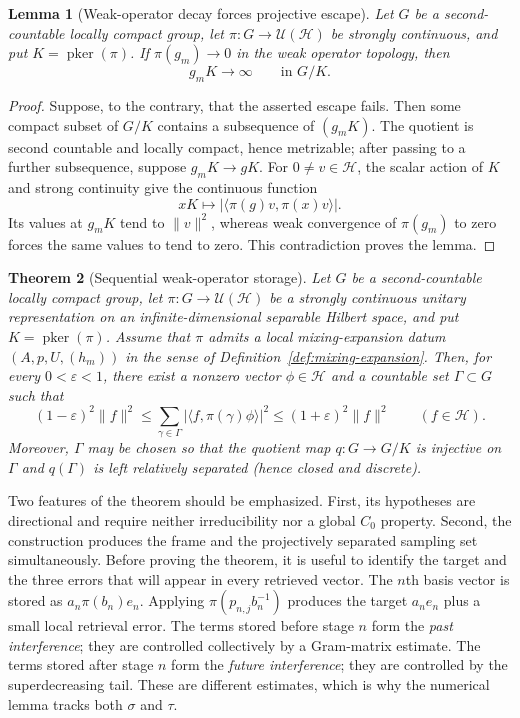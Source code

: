 \documentclass[10pt,a4paper]{amsart}
\numberwithin{equation}{section}
\newtheorem{theorem}{Theorem}[section]
\newtheorem{lemma}[theorem]{Lemma}
\newcommand{\cH}{\mathcal H}
\newcommand{\U}{\mathcal U}
\newcommand{\pker}{\operatorname{pker}}
\begin{document}
\begin{lemma}[Weak-operator decay forces projective escape]
\label{lem:wot-projective-escape}
Let $G$ be a second-countable locally compact group, let
$\pi:G\to\U(\cH)$ be strongly continuous, and put $K=\pker(\pi)$.  If
$\pi(g_m)\to0$ in the weak operator topology, then
\[
  g_mK\longrightarrow\infty\qquad\text{in }G/K.
\]
\end{lemma}

\begin{proof}
Suppose, to the contrary, that the asserted escape fails.  Then some compact
subset of $G/K$ contains a subsequence of $(g_mK)$.
The quotient is second countable and locally compact, hence metrizable; after
passing to a further subsequence, suppose $g_mK\to gK$.  For $0\neq v\in\cH$,
the scalar action of $K$ and strong continuity give the continuous function
\[
 xK\longmapsto |\langle\pi(g)v,\pi(x)v\rangle|.
\]
Its values at $g_mK$ tend to $\|v\|^2$, whereas weak convergence of
$\pi(g_m)$ to zero forces the same values to tend to zero.  This
contradiction proves the lemma.
\end{proof}

\begin{theorem}[Sequential weak-operator storage]
\label{thm:abstract-storage}
Let $G$ be a second-countable locally compact group, let
$\pi:G\to\U(\cH)$ be a strongly continuous unitary representation on an
infinite-dimensional separable Hilbert space, and put $K=\pker(\pi)$.
Assume that $\pi$ admits a local mixing-expansion datum
$(A,p,U,(h_m))$ in the sense of Definition~\ref{def:mixing-expansion}.
Then, for every $0<\varepsilon<1$, there exist a nonzero vector
$\phi\in\cH$ and a countable set $\Gamma\subset G$ such that
\begin{equation}\label{eq:storage-frame}
 (1-\varepsilon)^2\|f\|^2
 \leq \sum_{\gamma\in\Gamma}
       |\langle f,\pi(\gamma)\phi\rangle|^2
 \leq (1+\varepsilon)^2\|f\|^2
 \qquad(f\in\cH).
\end{equation}
Moreover, $\Gamma$ may be chosen so that the quotient map
$q:G\to G/K$ is injective on $\Gamma$ and $q(\Gamma)$ is left relatively
separated (hence closed and discrete).
\end{theorem}

Two features of the theorem should be emphasized.  First, its hypotheses are
directional and require neither irreducibility nor a global $C_0$ property.
Second, the construction produces the frame and the projectively separated
sampling set simultaneously.  Before proving the theorem, it is useful to
identify the target and the
three errors that will appear in every retrieved vector.  The $n$th basis
vector is stored as $a_n\pi(b_n)e_n$.  Applying
$\pi(p_{n,j}b_n^{-1})$ produces the target $a_ne_n$ plus a small local
retrieval error.  The terms stored before stage $n$ form the \emph{past
interference}; they are controlled collectively by a Gram-matrix estimate.
The terms stored after stage $n$ form the \emph{future interference}; they
are controlled by the superdecreasing tail.  These are different estimates,
which is why the numerical lemma tracks both $\sigma$ and $\tau$.
\end{document}

